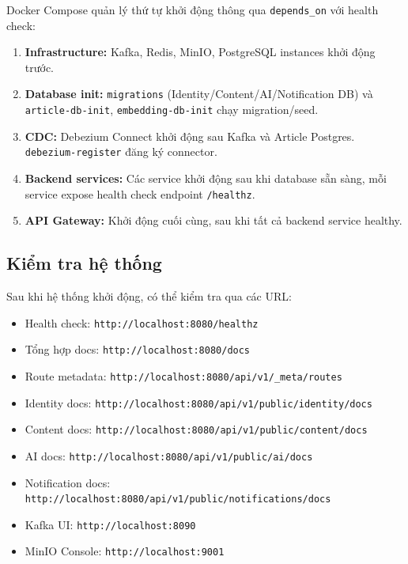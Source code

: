 \documentclass[14pt,a4paper,oneside]{extreport}
\begin{document}
Docker Compose quản lý thứ tự khởi động thông qua \texttt{depends\_on} với health check:

\begin{enumerate}[leftmargin=2cm]
  \item \textbf{Infrastructure:} Kafka, Redis, MinIO, PostgreSQL instances khởi động trước.
  \item \textbf{Database init:} \texttt{migrations} (Identity/Content/AI/Notification DB) và \texttt{article-db-init}, \texttt{embedding-db-init} chạy migration/seed.
  \item \textbf{CDC:} Debezium Connect khởi động sau Kafka và Article Postgres. \texttt{debezium-register} đăng ký connector.
  \item \textbf{Backend services:} Các service khởi động sau khi database sẵn sàng, mỗi service expose health check endpoint \texttt{/healthz}.
  \item \textbf{API Gateway:} Khởi động cuối cùng, sau khi tất cả backend service healthy.
\end{enumerate}

\subsection{Kiểm tra hệ thống}

Sau khi hệ thống khởi động, có thể kiểm tra qua các URL:

\begin{itemize}[leftmargin=2cm]
  \item Health check: \texttt{http://localhost:8080/healthz}
  \item Tổng hợp docs: \texttt{http://localhost:8080/docs}
  \item Route metadata: \texttt{http://localhost:8080/api/v1/\_meta/routes}
  \item Identity docs: \texttt{http://localhost:8080/api/v1/public/identity/docs}
  \item Content docs: \texttt{http://localhost:8080/api/v1/public/content/docs}
  \item AI docs: \texttt{http://localhost:8080/api/v1/public/ai/docs}
  \item Notification docs: \texttt{http://localhost:8080/api/v1/public/notifications/docs}
  \item Kafka UI: \texttt{http://localhost:8090}
  \item MinIO Console: \texttt{http://localhost:9001}
\end{itemize}
\end{document}
